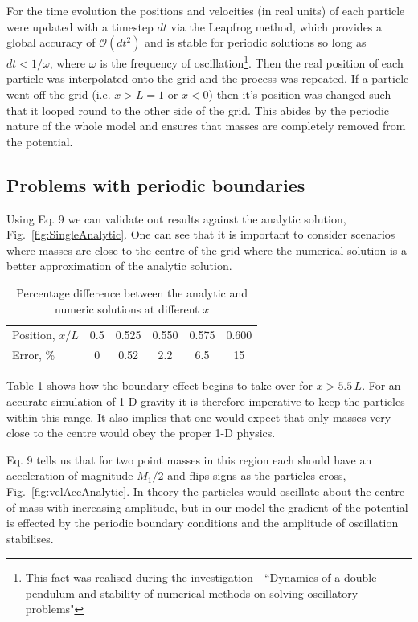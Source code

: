 \documentclass[10pt,a4paper]{article}
\begin{document}
For the time evolution the positions and velocities (in real units) of each particle were updated with a timestep $dt$ via the Leapfrog method, which provides a global accuracy of $\mathcal{O}(dt^2)$ and is stable for periodic solutions so long as $dt < 1/\omega$, where $\omega$ is the frequency of oscillation\footnote{This fact was realised during the investigation - ``Dynamics of a double pendulum and stability of numerical methods on solving oscillatory problems"}. Then the real position of each particle was interpolated onto the grid and  the process was repeated. If a particle went off the grid (i.e. $x>L=1$ or $x<0$) then it's position was changed such that it looped round to the other side of the grid. This abides by the periodic nature of the whole model and ensures that masses are completely removed from the potential.
 
\subsection{Problems with periodic boundaries}
Using Eq. 9 we can validate out results against the analytic solution, Fig.~\ref{fig:SingleAnalytic}. One can see that it is important to consider scenarios where masses are close to the centre of the grid where the numerical solution is a better approximation of the analytic solution.

\begin{table}[h!]
\label{tab:ResultsUndamped}
\caption{Percentage difference between the analytic and numeric solutions at different $x$}
\centering
\begin{tabular}{l c c c c c}
\hline\hline
Position, $x/L$ & 0.5 & 0.525 & 0.550 & 0.575 & 0.600 \\ [1ex]
Error, \% & 0 & 0.52 & 2.2 & 6.5 & 15 \\ [1ex]
\hline
\end{tabular}
\label{table:nonlin}
\end{table}
Table 1 shows how the boundary effect begins to take over for $x>5.5\, L$. For an accurate simulation of 1-D gravity it is therefore imperative to keep the particles within this range. It also implies that one would expect that only masses very close to the centre would obey the proper 1-D physics. 

Eq. 9 tells us that for two point masses in this region each should have an acceleration of magnitude $M_1/2$ and flips signs as the particles cross, Fig.~\ref{fig:velAccAnalytic}. In theory the particles would oscillate about the centre of mass with increasing amplitude, but in our model the gradient of the potential is effected by the periodic boundary conditions and the amplitude of oscillation stabilises.
\end{document}
